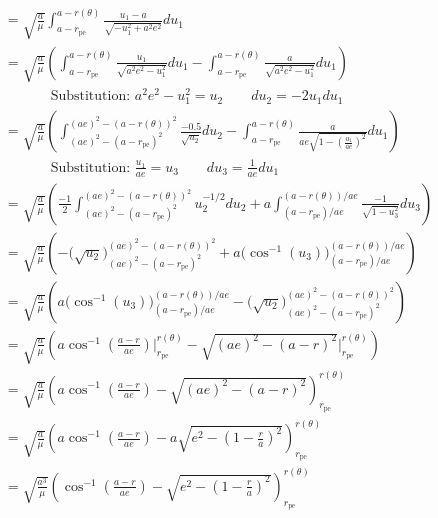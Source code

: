 \documentclass[../main.tex]{subfiles}
\begin{document}
\begin{align*}
        & =\sqrt{\frac{a}{\mu}}\int_{a-r_\text{pe}}^{a-r(\theta)}\frac{u_1-a}{\sqrt{-u_1^2+a^2e^2}}du_1                                                                                                                  \\
        & =\sqrt{\frac{a}{\mu}}\left(\int_{a-r_\text{pe}}^{a-r(\theta)}\frac{u_1}{\sqrt{a^2e^2-u_1^2}}du_1-\int_{a-r_\text{pe}}^{a-r(\theta)}\frac{a}{\sqrt{a^2e^2-u_1^2}}du_1\right)                                    \\
        & \phantom{=}\qquad{}\text{Substitution: }a^2e^2-u_1^2=u_2\qquad{}du_2=-2u_1du_1                                                                                                                                 \\
        & =\sqrt{\frac{a}{\mu}}\left(\int_{(ae)^2-(a-r_\text{pe})^2}^{(ae)^2-(a-r(\theta))^2}\frac{-0.5}{\sqrt{u_2}}du_2-\int_{a-r_\text{pe}}^{a-r(\theta)}\frac{a}{ae\sqrt{1-\left(\frac{u_1}{ae}\right)^2}}du_1\right) \\
        & \phantom{=}\qquad{}\text{Substitution: }\frac{u_1}{ae}=u_3\qquad{}du_3=\frac{1}{ae}du_1                                                                                                                        \\
        & =\sqrt{\frac{a}{\mu}}\left(\frac{-1}{2}\int_{(ae)^2-(a-r_\text{pe})^2}^{(ae)^2-(a-r(\theta))^2}u_2^{-1/2}du_2+a\int_{(a-r_\text{pe})/ae}^{(a-r(\theta))/ae}\frac{-1}{\sqrt{1-u_3^2}}du_3\right)                \\
        & =\sqrt{\frac{a}{\mu}}\left(-\Big(\sqrt{u_2}\Big)_{(ae)^2-(a-r_\text{pe})^2}^{(ae)^2-(a-r(\theta))^2}+a\Big(\cos^{-1}(u_3)\Big)_{(a-r_\text{pe})/ae}^{(a-r(\theta))/ae}\right)                                  \\
        & =\sqrt{\frac{a}{\mu}}\left(a\Big(\cos^{-1}(u_3)\Big)_{(a-r_\text{pe})/ae}^{(a-r(\theta))/ae}-\Big(\sqrt{u_2}\Big)_{(ae)^2-(a-r_\text{pe})^2}^{(ae)^2-(a-r(\theta))^2}\right)                                   \\
        & =\sqrt{\frac{a}{\mu}}\left(a\cos^{-1}\left(\frac{a-r}{ae}\right)\Big|_{r_\text{pe}}^{r(\theta)}-\sqrt{(ae)^2-(a-r)^2}\Big|_{r_\text{pe}}^{r(\theta)}\right)                                                    \\
        & =\sqrt{\frac{a}{\mu}}\left(a\cos^{-1}\left(\frac{a-r}{ae}\right)-\sqrt{(ae)^2-(a-r)^2}\right)_{r_\text{pe}}^{r(\theta)}                                                                                        \\
        & =\sqrt{\frac{a}{\mu}}\left(a\cos^{-1}\left(\frac{a-r}{ae}\right)-a\sqrt{e^2-\left(1-\frac{r}{a}\right)^2}\right)_{r_\text{pe}}^{r(\theta)}                                                                     \\
        & =\sqrt{\frac{a^3}{\mu}}\left(\cos^{-1}\left(\frac{a-r}{ae}\right)- \sqrt{e^2-\left(1-\frac{r}{a}\right)^2}\right)_{r_\text{pe}}^{r(\theta)}                                                                    \\
\end{align*}
\end{document}
